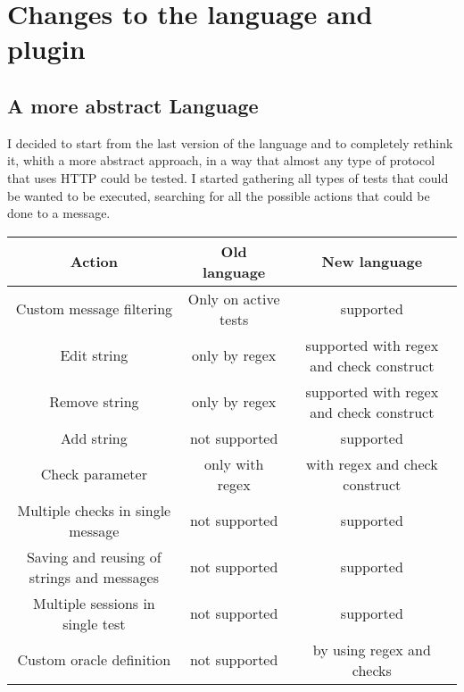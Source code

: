 \chapter{Changes to the language and plugin}
\label{cha:intro}

\section{A more abstract Language}
\label{sec:context}

I decided to start from the last version of the language and to completely rethink it, whith a more abstract approach, in a way that almost any type of protocol that uses HTTP could be tested. I started gathering all types of tests that could be wanted to be executed, searching for all the possible actions that could be done to a message.

\begin{center}
    \begin{tabular}{ |c|c|c| }
        \hline
        Action                                     & Old language         & New language                             \\
        \hline
        Custom message filtering                   & Only on active tests & supported                                \\
        Edit string                                & only by regex        & supported with regex and check construct \\
        Remove string                              & only by regex        & supported with regex and check construct \\
        Add string                                 & not supported        & supported                                \\
        Check parameter                            & only with regex      & with regex and check construct           \\
        Multiple checks in single message          & not supported        & supported                                \\
        Saving and reusing of strings and messages & not supported        & supported                                \\
        Multiple sessions in single test           & not supported        & supported                                \\
        Custom oracle definition                   & not supported        & by using regex and checks                \\

        \hline
    \end{tabular}
\end{center}